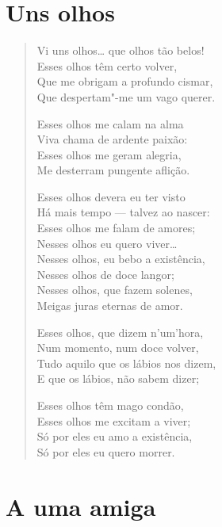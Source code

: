 \chapter{Uns olhos}

\begin{verse}
Vi uns olhos\ldots{} que olhos tão belos!\\
Esses olhos têm certo volver,\\
Que me obrigam a profundo cismar,\\
Que despertam"-me um vago querer.

Esses olhos me calam na alma\\
Viva chama de ardente paixão:\\
Esses olhos me geram alegria,\\
Me desterram pungente aflição.

Esses olhos devera eu ter visto\\
Há mais tempo --- talvez ao nascer:\\
Esses olhos me falam de amores;\\
Nesses olhos eu quero viver\ldots{}\\
Nesses olhos, eu bebo a existência,\\
Nesses olhos de doce langor;\\
Nesses olhos, que fazem solenes,\\
Meigas juras eternas de amor.

Esses olhos, que dizem n'um'hora,\\
Num momento, num doce volver,\\
Tudo aquilo que os lábios nos dizem,\\
E que os lábios, não sabem dizer;

Esses olhos têm mago condão,\\ \enlargethispage{\baselineskip}
Esses olhos me excitam a viver;\\
Só por eles eu amo a existência,\\
Só por eles eu quero morrer.
\end{verse}

\chapter{A uma amiga}


